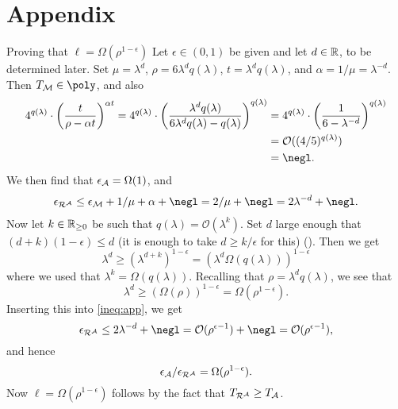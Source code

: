 
\section{Appendix}


\begin{namedproof}{Proving that \(\ell = \Omega(\rho^{1-\epsilon})\)}
  Let \(\epsilon \in (0,1)\) be given
  and let \(d \in \mathbb{R}\), to be determined later.
  Set \(\mu = \lambda^{d}\), \(\rho = 6 \lambda^{d} q(\lambda)\), \(t = \lambda^{d} q(\lambda)\),
  and \(\alpha = 1/\mu = \lambda^{-d}\).
  Then \(T_{\redM} \in \poly\), and also
  \begin{align}
    4^{q(\lambda)} \cdot \left( \frac{t}{\rho - \alpha t} \right)^{\alpha t}
    =
    4^{q(\lambda)} \cdot \left( \frac{\lambda^{d} q(\lambda)}{6\lambda^{d} q(\lambda) - q(\lambda)} \right)^{q(\lambda)}
    & = 4^{q(\lambda)} \cdot \left( \frac{1}{6 - \lambda^{-d}} \right)^{q(\lambda)} \notag\\
    & = \mathcal{O}((4 / 5)^{q(\lambda)})\notag\\
    & = \negl \notag.
  \end{align}
  We then find that
  \(\epsilon_{\mathcal{A}} = \Omega(1)\), and
  \begin{align}\label{ineq:app}
    \epsilon_{\redR^{\advA}} \le \epsilon_{\redM} + 1/\mu + \alpha + \negl
    = 2/\mu + \negl
    = 2\lambda^{-d} + \negl.
  \end{align}
  Now let \(k \in \mathbb{R}_{\ge 0}\) be such that \(q(\lambda) = \mathcal{O}(\lambda^{k})\).
  Set \(d\) large enough that \((d+k)(1-\epsilon) \le d\)
  (it is enough to take \(d \ge k/\epsilon\) for this) ().
  Then we get
  \[
    \lambda^{d} \ge (\lambda^{d+k})^{1-\epsilon} = (\lambda^{d} \Omega(q(\lambda)))^{1-\epsilon}
  \]
  where we used that \(\lambda^{k} = \Omega(q(\lambda))\).
  Recalling that \(\rho = \lambda^{d} q(\lambda)\), we see that
  \[
    \lambda^{d} \ge (\Omega(\rho))^{1-\epsilon} = \Omega(\rho^{1-\epsilon}).
  \]
  Inserting this into \eqref{ineq:app}, we get
  \[
    \epsilon_{\redR^{\advA}} \le 2\lambda^{-d} + \negl
    = \mathcal{O}(\rho^{\epsilon-1}) + \negl
    = \mathcal{O}(\rho^{\epsilon-1}),
  \]
  and hence
  \[
    \epsilon_{\advA} / \epsilon_{\redR^{\advA}} = \Omega(\rho^{1-\epsilon}).
  \]
  Now \(\ell = \Omega(\rho^{1-\epsilon})\) follows by the fact that \(T_{\redR^{\advA}} \ge T_{\advA}\).
\end{namedproof}



